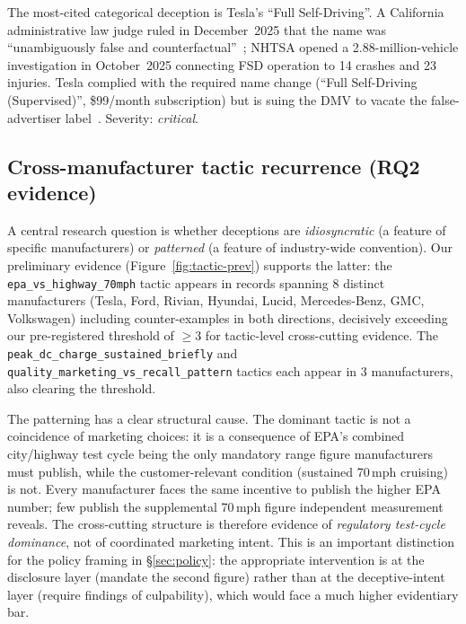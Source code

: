 \documentclass{article}
\begin{document}
The most-cited categorical deception is Tesla's ``Full Self-Driving''. A California administrative law judge ruled in December~2025 that the name was ``unambiguously false and counterfactual''~\cite{techcrunch_fsd_ruling_2025}; NHTSA opened a 2.88-million-vehicle investigation in October~2025 connecting FSD operation to 14 crashes and 23 injuries. Tesla complied with the required name change (``Full Self-Driving (Supervised)'', \$99/month subscription) but is suing the DMV to vacate the false-advertiser label~\cite{electrek_tesla_fsd_lawsuit}. Severity: \emph{critical}.

\subsection{Cross-manufacturer tactic recurrence (RQ2 evidence)}\label{sec:rq2}

A central research question is whether deceptions are \emph{idiosyncratic} (a feature of specific manufacturers) or \emph{patterned} (a feature of industry-wide convention). Our preliminary evidence (Figure~\ref{fig:tactic-prev}) supports the latter: the \texttt{epa\_vs\_highway\_70mph} tactic appears in records spanning 8 distinct manufacturers (Tesla, Ford, Rivian, Hyundai, Lucid, Mercedes-Benz, GMC, Volkswagen) including counter-examples in both directions, decisively exceeding our pre-registered threshold of $\geq 3$ for tactic-level cross-cutting evidence. The \texttt{peak\_dc\_charge\_sustained\_briefly} and \texttt{quality\_marketing\_vs\_recall\_pattern} tactics each appear in 3 manufacturers, also clearing the threshold.

The patterning has a clear structural cause. The dominant tactic is not a coincidence of marketing choices: it is a consequence of EPA's combined city/highway test cycle being the only mandatory range figure manufacturers must publish, while the customer-relevant condition (sustained 70\,mph cruising) is not. Every manufacturer faces the same incentive to publish the higher EPA number; few publish the supplemental 70\,mph figure independent measurement reveals. The cross-cutting structure is therefore evidence of \emph{regulatory test-cycle dominance}, not of coordinated marketing intent. This is an important distinction for the policy framing in \S\ref{sec:policy}: the appropriate intervention is at the disclosure layer (mandate the second figure) rather than at the deceptive-intent layer (require findings of culpability), which would face a much higher evidentiary bar.
\end{document}
